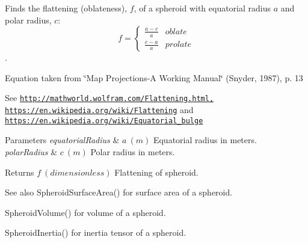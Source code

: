 Finds the flattening (oblateness), $f$, of a spheroid with equatorial radius $a$ and polar radius, $c$\+: \[ f =\begin{cases} \frac{a-c}{a}{} & oblate \\ \frac{c-a}{a} & prolate \end{cases} \]. 

Equation taken from \char`\"{}\+Map Projections-\/\+A Working Manual\char`\"{} (Snyder, 1987), p. 13

See \href{http://mathworld.wolfram.com/Flattening.html,}{\tt http\+://mathworld.\+wolfram.\+com/\+Flattening.\+html,} \href{https://en.wikipedia.org/wiki/Flattening}{\tt https\+://en.\+wikipedia.\+org/wiki/\+Flattening} and \href{https://en.wikipedia.org/wiki/Equatorial_bulge}{\tt https\+://en.\+wikipedia.\+org/wiki/\+Equatorial\+\_\+bulge} 
\begin{DoxyParams}{Parameters}
{\em equatorial\+Radius} & $ a\ (m)$ Equatorial radius in meters. \\
\hline
{\em polar\+Radius} & $ c\ (m)$ Polar radius in meters. \\
\hline
\end{DoxyParams}
\begin{DoxyReturn}{Returns}
$ f\ (dimensionless)$ Flattening of spheroid. 
\end{DoxyReturn}
\begin{DoxySeeAlso}{See also}
Spheroid\+Surface\+Area() for surface area of a spheroid. 

Spheroid\+Volume() for volume of a spheroid. 

Spheroid\+Inertia() for inertia tensor of a spheroid. 
\end{DoxySeeAlso}
